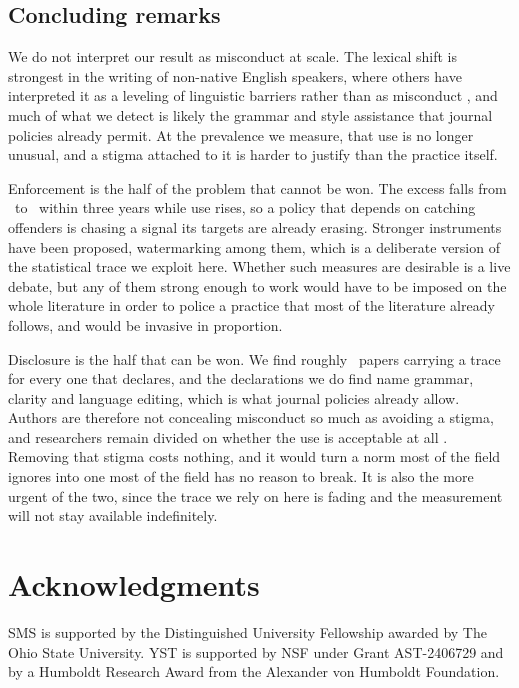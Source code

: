 \documentclass[twocolumn]{aastex631}
\begin{document}
\subsection{Concluding remarks}\label{sec:follows}

We do not interpret our result as misconduct at scale. The lexical shift is strongest in the writing of non-native English speakers, where others have interpreted it as a leveling of linguistic barriers rather than as misconduct \citep{Lin2025}, and much of what we detect is likely the grammar and style assistance that journal policies already permit. At the prevalence we measure, that use is no longer unusual, and a stigma attached to it is harder to justify than the practice itself.

Enforcement is the half of the problem that cannot be won. The excess falls from \deltaEarly\ to \deltaLate\ within three years while use rises, so a policy that depends on catching offenders is chasing a signal its targets are already erasing. Stronger instruments have been proposed, watermarking among them, which is a deliberate version of the statistical trace we exploit here. Whether such measures are desirable is a live debate, but any of them strong enough to work would have to be imposed on the whole literature in order to police a practice that most of the literature already follows, and would be invasive in proportion.

Disclosure is the half that can be won. We find roughly \disclosureGapFactor\ papers carrying a trace for every one that declares, and the declarations we do find name grammar, clarity and language editing, which is what journal policies already allow. Authors are therefore not concealing misconduct so much as avoiding a stigma, and researchers remain divided on whether the use is acceptable at all \citep{Kwon2025}. Removing that stigma costs nothing, and it would turn a norm most of the field ignores into one most of the field has no reason to break. It is also the more urgent of the two, since the trace we rely on here is fading and the measurement will not stay available indefinitely.

\section*{Acknowledgments}

SMS is supported by the Distinguished University Fellowship awarded by The Ohio State University. YST is supported by NSF under Grant AST-2406729 and by a Humboldt Research Award from the Alexander von Humboldt Foundation.
\end{document}
